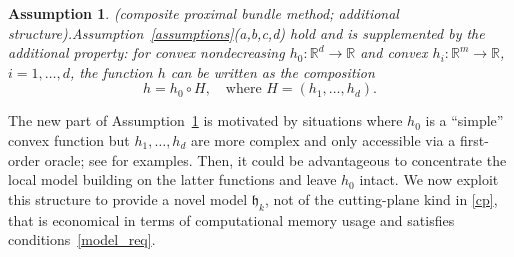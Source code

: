 \documentclass[smallextended,envcountsect]{svjour3}
\newtheorem{assumption}{Assumption}
\newcommand{\fc}[2]{: #1 \rightarrow #2}
\renewcommand{\Re}{\mathbb{R}}
\newcommand{\modelh}{\mathfrak{h}}
\begin{document}
\begin{assumption}{\rm (composite proximal bundle method; additional structure).}\label{assumptions-3layers}
Assumption~\ref{assumptions}(a,b,c,d) hold and is supplemented by the additional property: for convex nondecreasing $h_0\fc{\Re^d}{ \Re}$ and convex $h_i\fc{\Re^m}{ \Re}$, $i=1,\ldots,d$, the function $h$ can be written as the composition
\[
h = h_0 \circ H, ~~~\text{ where } H = (h_1, \dots, h_d).
\]
\end{assumption}

The new part of Assumption~\ref{assumptions-3layers} is motivated by situations where $h_0$ is a ``simple'' convex function but $h_1, \dots, h_d$ are more complex and only accessible via a first-order oracle; see \cite{Ferris_Huber_Royset_2024} for examples. Then, it could be advantageous to concentrate the local model building on the latter functions and leave $h_0$ intact. We now exploit this structure to provide a novel model $\modelh_k$, not of the cutting-plane kind in \eqref{cp}, that is economical in terms of computational memory usage and satisfies conditions~\eqref{model_req}.
\end{document}
